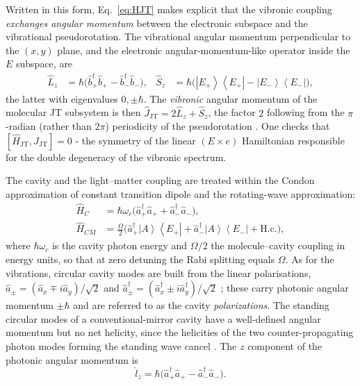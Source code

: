 \documentclass[12pt,a4paper]{article}
\newcommand{\JT}{\mathrm{JT}}
\newcommand{\ket}[1]{\left|#1\right\rangle}
\newcommand{\bra}[1]{\left\langle#1\right|}
\newcommand{\hc}{\mathrm{H.c.}}
\begin{document}
Written in this form, Eq.~\eqref{eq:HJT} makes explicit that the vibronic
coupling \emph{exchanges angular momentum} between the electronic subspace and
the vibrational pseudorotation. The vibrational angular momentum perpendicular
to the $(x,y)$ plane, and the electronic angular-momentum-like operator inside
the $E$ subspace, are
\begin{align}
  \hat L_z&=\hbar\big(\hat b^\dagger_+\hat b_+-\hat b^\dagger_-\hat b_-\big),
  &
  \hat S_z&=\hbar\big(\ket{E_+}\bra{E_+}-\ket{E_-}\bra{E_-}\big),
  \label{eq:LzSz}
\end{align}
the latter with eigenvalues $0,\pm\hbar$. The \emph{vibronic} angular momentum of the
molecular JT subsystem is then $\hat J_{\JT}=2\hat L_z+\hat S_z$, the factor
$2$ following from the $\pi$-radian (rather than $2\pi$) periodicity of the
pseudorotation \cite{LonguetHiggins1958}. One checks that
$[\hat H_{\JT},\hat J_{\JT}]=0$ - the symmetry of the linear $(E\times e)$
Hamiltonian responsible for the double degeneracy of the vibronic spectrum.

The cavity and the light--matter coupling are treated within the Condon
approximation of constant transition dipole and the rotating-wave
approximation:
\begin{align}
  \hat H_C&=\hbar\omega_c\big(\hat a^\dagger_+\hat a_++
             \hat a^\dagger_-\hat a_-\big),\nonumber\\
  \hat H_{CM}&=\frac{\Omega}{2}\big(\hat a^\dagger_+\ket{A}\bra{E_+}+
             \hat a^\dagger_-\ket{A}\bra{E_-}+\hc\big),
  \label{eq:HCM}
\end{align}
where $\hbar\omega_c$ is the cavity photon energy and $\Omega/2$ the
molecule--cavity coupling in energy units, so that at zero detuning the Rabi
splitting equals $\Omega$. As for the vibrations, circular cavity modes are
built from the linear polarisations,
$\hat a_\pm=(\hat a_x\mp i\hat a_y)/\sqrt2$ and
$\hat a^\dagger_\pm=(\hat a^\dagger_x\pm i\hat a^\dagger_y)/\sqrt2$
\cite{Crisp1991}; these carry photonic angular momentum $\pm\hbar$ and are
referred to as the cavity \emph{polarizations}. The
standing circular modes of a conventional-mirror cavity have a well-defined
angular momentum but no net helicity, since the helicities of the two
counter-propagating photon modes forming the standing wave cancel
\cite{Barnett2012}. The $z$ component of the photonic angular momentum is
\begin{equation}
  \hat l_z=\hbar\big(\hat a^\dagger_+\hat a_+-\hat a^\dagger_-\hat a_-\big).
  \label{eq:lz}
\end{equation}
\end{document}
